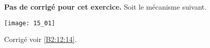 \normalfalse \difficiletrue \tdifficilefalse
\correctionfalse


\setcounter{question}{0}
\ifcorrection
\else
\textbf{Pas de corrigé pour cet exercice.}
\fi
\ifprof
\else
Soit le mécanisme suivant.
\begin{center}
\texttt{[image: 15\_01]}
\end{center}
\fi



\ifprof
\else
\fi


\ifprof
\else
\begin{flushright}
\footnotesize{Corrigé  voir \ref{B2:12:14}.}
\end{flushright}%
\fi